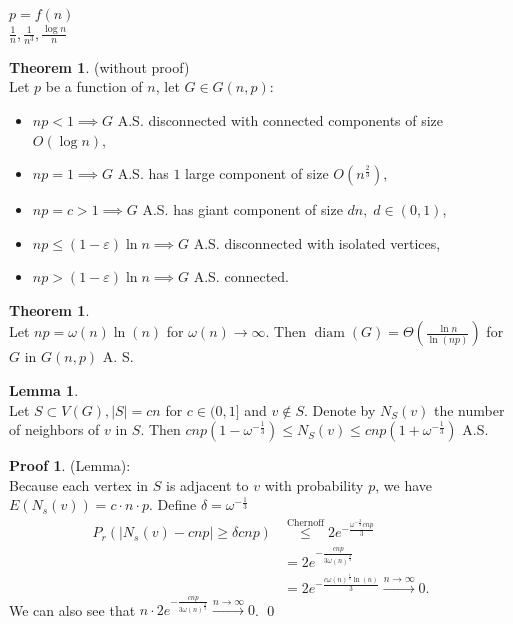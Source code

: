 \documentclass[a4paper, 12pt]{book}
\theoremstyle{definition}
\newtheorem{lemma}[counter]{Lemma}
\newtheorem{theorem}[counter]{Theorem}
\newtheorem{pro}[counter]{Proof}
\theoremstyle{remark}
\DeclareMathOperator{\diam}{diam}
\begin{document}
$p = f(n)$ \\
$\frac{1}{n}, \frac{1}{n^3}, \frac{\log n}{n}$
\begin{theorem} (without proof) \\
  Let $p$ be a function of $n$, let $G \in G(n,p)$:
  \begin{itemize}
    \item $np < 1 \implies G$ A.S. disconnected with connected components of size $O(\log n)$,
    \item $np = 1 \implies G$ A.S. has $1$ large component of size $O\left(n^{\frac{2}{3}}\right)$,
    \item $np = c > 1 \implies G$ A.S. has giant component of size $dn, \; d \in (0,1)$,
    \item $np \leq (1-\varepsilon) \ln n \implies G$ A.S. disconnected with isolated vertices,
    \item $np > (1-\varepsilon) \ln n \implies G$ A.S. connected.
  \end{itemize}
\end{theorem}
\begin{theorem} \text{} \\
  Let $np = \omega(n) \ln(n)$ for $\omega(n) \to \infty$. Then $\diam(G) = \Theta\left(\frac{\ln n}{\ln (np)}\right)$ for $G$ in $G(n,p)$ A. S.
\end{theorem}
\begin{lemma} \text{} \\
  Let $S \subset V(G), |S| = cn$ for $c \in (0,1]$ and $v \notin S$. Denote by $N_S(v)$ the number of neighbors of $v$ in $S$. Then $cnp(1-\omega^{-\frac{1}{3}}) \leq N_S(v) \leq cnp(1+\omega^{-\frac{1}{3}})$ A.S.
\end{lemma}
\begin{pro}(Lemma): \\
  Because each vertex in $S$ is adjacent to $v$ with probability $p$, we have $E(N_s(v)) = c \cdot n \cdot p$. Define $\delta = \omega^{-\frac{1}{3}}$
  \begin{align*}
    P_r(|N_s(v) - cnp| \geq \delta cnp) &\stackrel{\text{Chernoff}}{\leq} 2 e^{-\frac{\omega^{-\frac{2}{3}} cnp}{3}} \\
    &= 2 e^{-\frac{cnp}{3 \omega(n)^{\frac{2}{3}}}} \\
    &= 2 e^{-\frac{c\omega(n)^{\frac{1}{3}}\ln(n)}{3}}\stackrel{n \to \infty}{\longrightarrow} 0.
  \end{align*}
  We can also see that $n \cdot 2 e^{-\frac{cnp}{3 \omega(n)^{\frac{2}{3}}}} \stackrel{n \to \infty}{\longrightarrow} 0$.
  \qed
\end{pro}
\end{document}
